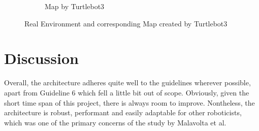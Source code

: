 \documentclass[%
paper=A4,               %
twoside=true,           %
openright,              %
11pt,                   %
bibliography=totoc,     %
titlepage=on,           %
DIV=12,                 %
BCOR=1.5cm,             %
parskip=half,            %
final
]{scrreprt}
\begin{document}
\begin{figure}[H]
\begin{subfigure}[b]{0.45\textwidth}
			\caption{Map by Turtlebot3}
			\label{fig:fig15}
		\end{subfigure}
		
		\caption{Real Environment and corresponding Map created by Turtlebot3}
		\label{fig:RealWorldSetup}
	\end{figure}	
	
	
	\chapter{Discussion}
	Overall, the architecture adheres quite well to the guidelines wherever possible, apart from
	Guideline 6 which fell a little bit out of scope. Obviously, given the short time span of this project, there is always room to improve. Nontheless, the architecture is robust, performant and easily adaptable for other roboticists, which was one of the primary concerns of the study by Malavolta et al.
	
\end{document}

